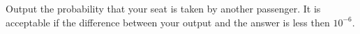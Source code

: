 Output the probability that your seat is taken by another passenger.
It is acceptable if the difference between your output and the answer is
less then $10^{-6}$.
